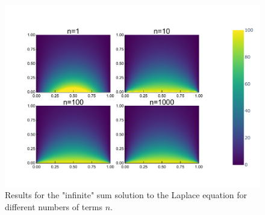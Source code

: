 \documentclass[
	a4paper, %
	10pt, %
]{CSUniSchoolLabReport}
\begin{document}
\begin{figure}[H]
	\centering
	\includegraphics[width=\textwidth]{../saves_t1/comp_lapplace_series_heatmap.pdf}
	\caption{Results for the "infinite" sum solution to the Laplace equation for different numbers of terms $n$.}
\end{figure}
\end{document}
